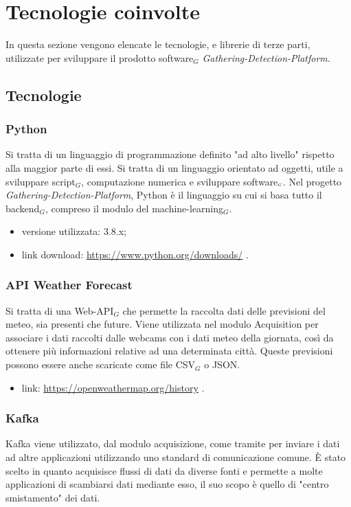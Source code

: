 \chapter{Tecnologie coinvolte}\label{TecnologieCoinvolte}
In questa sezione vengono elencate le tecnologie, e librerie di terze parti, utilizzate per sviluppare il prodotto software$_G$ \textit{Gathering-Detection-Platform}.

\section{Tecnologie}\label{Tecnologie}
\subsection{Python}\label{TecnologiePython}
Si tratta di un linguaggio di programmazione definito "ad alto livello" rispetto alla maggior parte di essi.
Si tratta di un linguaggio orientato ad oggetti, utile a sviluppare script$_G$, computazione numerica e sviluppare software$_{\scaleto{G}{3pt}}$.
Nel progetto \textit{Gathering-Detection-Platform}, Python è il linguaggio su cui si basa tutto il backend$_G$, compreso il modulo del machine-learning$_G$.

\begin{itemize}
  \item versione utilizzata: 3.8.x;
  \item link download: \url{https://www.python.org/downloads/} .
\end{itemize}

\subsection{API Weather Forecast}\label{APIWeatherForecast}
Si tratta di una Web-API$_G$ che permette la raccolta dati delle previsioni del meteo, sia presenti che future.
Viene utilizzata nel modulo Acquisition per associare i dati raccolti dalle webcams con i dati meteo della giornata, così da ottenere più informazioni relative ad una determinata città.
Queste previsioni possono essere anche scaricate come file CSV$_G$ o JSON.
\begin{itemize}
  \item link: \url{https://openweathermap.org/history} .
\end{itemize}


\subsection{Kafka}\label{TecnologieKafka}
Kafka viene utilizzato, dal modulo acquisizione, come tramite per inviare i dati ad altre applicazioni utilizzando uno standard di comunicazione comune.
È stato scelto in quanto acquisisce flussi di dati da diverse fonti e permette a molte applicazioni di scambiarsi dati mediante esso, il suo scopo è quello di "centro smistamento" dei dati.

